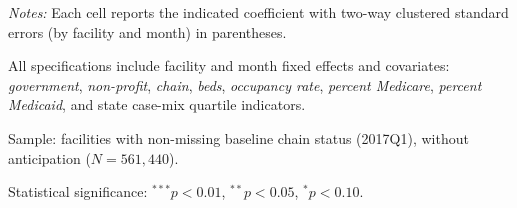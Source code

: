 \begin{table}[!ht]
\begin{threeparttable}
\begin{tablenotes}[flushleft]
\footnotesize
\item \textit{Notes:} Each cell reports the indicated coefficient with two-way clustered standard errors (by facility and month) in parentheses.
\item All specifications include facility and month fixed effects and covariates: \textit{government}, \textit{non-profit}, \textit{chain}, \textit{beds}, \textit{occupancy rate}, \textit{percent Medicare}, \textit{percent Medicaid}, and state case-mix quartile indicators.
\item Sample: facilities with non-missing baseline chain status (2017Q1), without anticipation ($N=561,440$).
\item Statistical significance: $^{***}p<0.01$, $^{**}p<0.05$, $^{*}p<0.10$.
\end{tablenotes}
\end{threeparttable}
\end{table}
\endgroup

